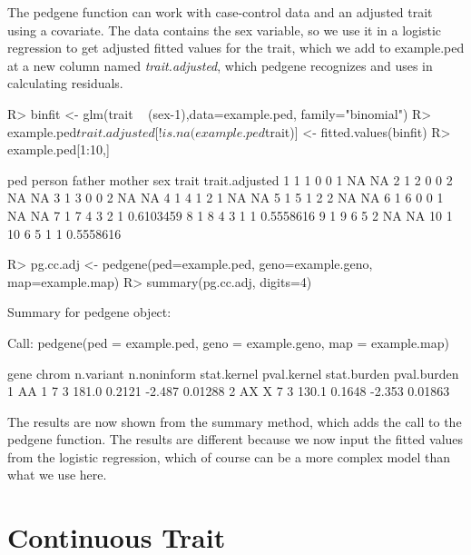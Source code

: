 \documentclass[letterpaper]{article}
\begin{document}
The pedgene function can work with case-control data and an adjusted trait using 
a covariate.  The data contains the sex variable, so we use it in a logistic regression to get 
adjusted fitted values for the trait, which we add to example.ped at a new column named
{\sl trait.adjusted}, which pedgene recognizes and uses in calculating residuals.

\begin{Schunk}
\begin{Sinput}
R> binfit <-  glm(trait ~ (sex-1),data=example.ped, family="binomial")
R> example.ped$trait.adjusted[!is.na(example.ped$trait)] <- fitted.values(binfit) 
R> example.ped[1:10,]
\end{Sinput}
\begin{Soutput}
   ped person father mother sex trait trait.adjusted
1    1      1      0      0   1    NA             NA
2    1      2      0      0   2    NA             NA
3    1      3      0      0   2    NA             NA
4    1      4      1      2   1    NA             NA
5    1      5      1      2   2    NA             NA
6    1      6      0      0   1    NA             NA
7    1      7      4      3   2     1      0.6103459
8    1      8      4      3   1     1      0.5558616
9    1      9      6      5   2    NA             NA
10   1     10      6      5   1     1      0.5558616
\end{Soutput}
\begin{Sinput}
R> pg.cc.adj <- pedgene(ped=example.ped, geno=example.geno, map=example.map)
R> summary(pg.cc.adj, digits=4)
\end{Sinput}
\begin{Soutput}
Summary for pedgene object: 

Call:
pedgene(ped = example.ped, geno = example.geno, map = example.map)


  gene chrom n.variant n.noninform stat.kernel pval.kernel stat.burden pval.burden
1   AA     1         7           3       181.0      0.2121      -2.487     0.01288
2   AX     X         7           3       130.1      0.1648      -2.353     0.01863
\end{Soutput}
\end{Schunk}

\noindent The results are now shown from the summary method, which
adds the call to the pedgene function.  The results are different because we now 
input the fitted values from the logistic regression, which of course can be a more 
complex model than what we use here.

\section{Continuous Trait}
\end{document}
